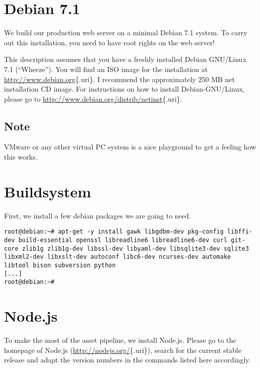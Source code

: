 \documentclass[a4paper]{book}
\newcounter{tab}[chapter]
\begin{document}
\section{Debian 7.1}\label{debian-7.1}

We build our production web server on a minimal Debian 7.1 system. To carry out this installation, you need to have root rights on the web server!

This description assumes that you have a freshly installed Debian GNU/Linux 7.1 (“Wheeze”). You will find an ISO image for the installation at \url{http://www.debian.org}\{.uri\}. I recommend the approximately 250 MB net installation CD image. For instructions on how to install Debian-GNU/Linux, please go to \url{http://www.debian.org/distrib/netinst}\{.uri\}.

\subsection{Note}\label{note-55}

VMware or any other virtual PC system is a nice playground to get a feeling how this works.

\section{Buildsystem}\label{buildsystem}

First, we install a few debian packages we are going to need.

\begin{shaded}\begin{verbatim}
root@debian:~# apt-get -y install gawk libgdbm-dev pkg-config libffi-dev build-essential openssl libreadline6 libreadline6-dev curl git-core zlib1g zlib1g-dev libssl-dev libyaml-dev libsqlite3-dev sqlite3 libxml2-dev libxslt-dev autoconf libc6-dev ncurses-dev automake libtool bison subversion python
[...]
root@debian:~#
\end{verbatim}\end{shaded}

\section{Node.js}\label{node.js}

To make the most of the asset pipeline, we install Node.js. Please go to the homepage of Node.js (\url{http://nodejs.org/}\{.uri\}), search for the current stable release and adapt the version numbers in the commands listed here accordingly.
\end{document}
